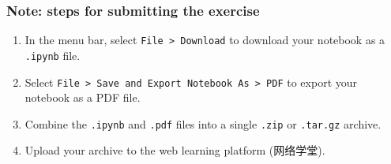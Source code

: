 \documentclass[11pt]{article}
\providecommand{\tightlist}{%
      \setlength{\itemsep}{0pt}\setlength{\parskip}{0pt}}
\begin{document}
    \subsubsection{Note: steps for submitting the
exercise}\label{note-steps-for-submitting-the-exercise}

\begin{enumerate}
\def\labelenumi{\arabic{enumi}.}
\tightlist
\item
  In the menu bar, select \texttt{File\ \textgreater{}\ Download} to
  download your notebook as a \texttt{.ipynb} file.
\item
  Select
  \texttt{File\ \textgreater{}\ Save\ and\ Export\ Notebook\ As\ \textgreater{}\ PDF}
  to export your notebook as a PDF file.
\item
  Combine the \texttt{.ipynb} and \texttt{.pdf} files into a single
  \texttt{.zip} or \texttt{.tar.gz} archive.
\item
  Upload your archive to the web learning platform (网络学堂).
\end{enumerate}


    
    
    
\end{document}
